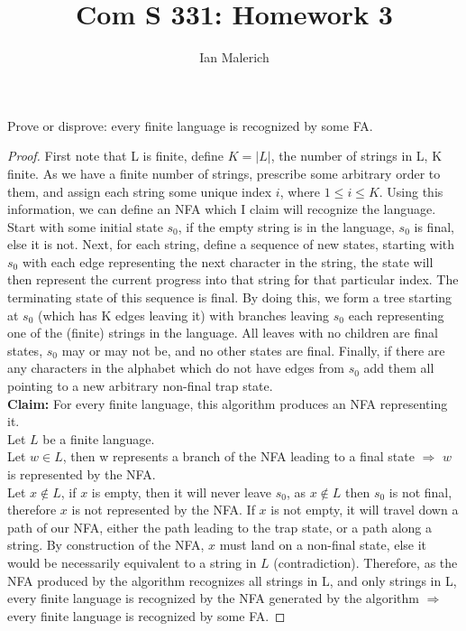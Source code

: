 \documentclass[12pt]{jhwhw}
\author{Ian Malerich}
\title{Com S 331: Homework 3}
\begin{document}
\raggedright

\problem{}

	Prove or disprove: every finite language is recognized by some FA.

\solution
	
	\begin{proof} First note that L is finite, define $K = |L|$, the number
		of strings in L, K finite.
		As we have a finite number of strings, prescribe some arbitrary order to them,
		and assign each string some unique index $i$, where $1 \leq i \leq K$. Using this
		information, we can define an NFA which I claim will recognize the language.
		Start with some initial state $s_0$, if the empty string is in the language,
		$s_0$ is final, else it is not. Next, for each string, define a sequence
		of new states, starting with $s_0$ with each edge representing the next character
		in the string, the state will then represent the current progress into that string
		for that particular index. The terminating state of this sequence is final.
		By doing this, we form a tree starting at $s_0$ (which has K edges leaving it)
		with branches leaving $s_0$ each representing one of the (finite) 
		strings in the language. All leaves with no children are final states, $s_0$ may
		or may not be, and no other states are final. Finally, if there are any characters
		in the alphabet which do not have edges from $s_0$ add them all pointing to a new
		arbitrary non-final trap state. \\
		\bigbreak
		\textbf{Claim:} For every finite language, this algorithm produces an NFA
		representing it. \\
		Let $L$ be a finite language. \\
		Let $w \in L$, then w represents a branch of the NFA leading to a final state 
			$\Rightarrow$ $w$ is represented by the NFA. \\
		Let $x \not\in L$, if $x$ is empty, then it will never leave $s_0$, as $x\not\in L$
			then $s_0$ is not final, therefore $x$ is not represented by the NFA.
			If $x$ is not empty, it will travel down a path of our NFA, either the
			path leading to the trap state, or a path along a string. By construction
			of the NFA, $x$ must land on a non-final state, else it would be necessarily
			equivalent to a string in $L$ (contradiction).
		\bigbreak
		Therefore, as the NFA produced by the algorithm recognizes all strings in L, and 
		only strings in L, every finite language is recognized by the NFA generated
		by the algorithm $\Rightarrow$ every finite language is recognized by some FA.

	\end{proof}
\end{document}
